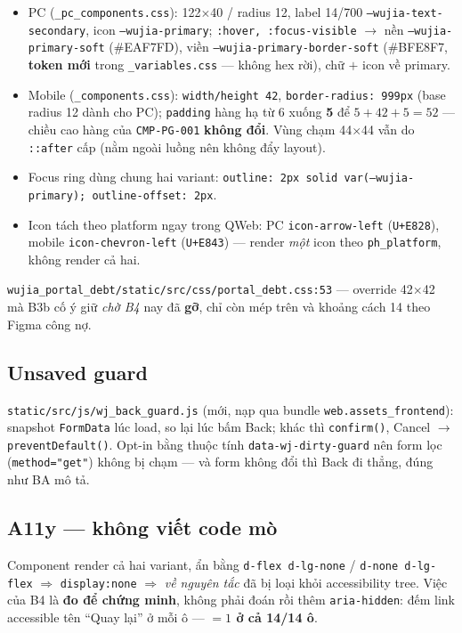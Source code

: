 \begin{itemize}
\item PC (\texttt{\_pc\_components.css}): 122$\times$40 / radius 12, label 14/700
  \texttt{--wujia-text-secondary}, icon \texttt{--wujia-primary};
  \texttt{:hover, :focus-visible} $\rightarrow$ nền \texttt{--wujia-primary-soft} (\#EAF7FD),
  viền \texttt{--wujia-primary-border-soft} (\#BFE8F7, \textbf{token mới} trong
  \texttt{\_variables.css} --- không hex rời), chữ $+$ icon về primary.
\item Mobile (\texttt{\_components.css}): \texttt{width/height 42}, \texttt{border-radius:
  999px} (base radius 12 dành cho PC); \texttt{padding} hàng hạ từ 6 xuống \textbf{5} để
  $5+42+5 = 52$ --- chiều cao hàng của \texttt{CMP-PG-001} \textbf{không đổi}. Vùng chạm
  44$\times$44 vẫn do \texttt{::after} cấp (nằm ngoài luồng nên không đẩy layout).
\item Focus ring dùng chung hai variant: \texttt{outline: 2px solid var(--wujia-primary);
  outline-offset: 2px}.
\item Icon tách theo platform ngay trong QWeb: PC \texttt{icon-arrow-left}
  (\texttt{U+E828}), mobile \texttt{icon-chevron-left} (\texttt{U+E843}) --- render \emph{một}
  icon theo \texttt{ph\_platform}, không render cả hai.
\end{itemize}

\texttt{wujia\_portal\_debt/static/src/css/portal\_debt.css:53} --- override 42$\times$42 mà
B3b cố ý giữ \emph{chờ B4} nay đã \textbf{gỡ}, chỉ còn mép trên và khoảng cách 14 theo Figma
công nợ.

\subsection{Unsaved guard}

\texttt{static/src/js/wj\_back\_guard.js} (mới, nạp qua bundle
\texttt{web.assets\_frontend}): snapshot \texttt{FormData} lúc load, so lại lúc bấm Back; khác
thì \texttt{confirm()}, Cancel $\rightarrow$ \texttt{preventDefault()}. Opt-in bằng thuộc tính
\texttt{data-wj-dirty-guard} nên form lọc (\texttt{method="get"}) không bị chạm --- và form
không đổi thì Back đi thẳng, đúng như BA mô tả.

\subsection{A11y --- không viết code mò}

Component render cả hai variant, ẩn bằng \texttt{d-flex d-lg-none} /
\texttt{d-none d-lg-flex} $\Rightarrow$ \texttt{display:none} $\Rightarrow$ \emph{về nguyên
tắc} đã bị loại khỏi accessibility tree. Việc của B4 là \textbf{đo để chứng minh}, không phải
đoán rồi thêm \texttt{aria-hidden}: đếm link accessible tên ``Quay lại'' ở mỗi ô ---
\textbf{$=1$ ở cả 14/14 ô}.

